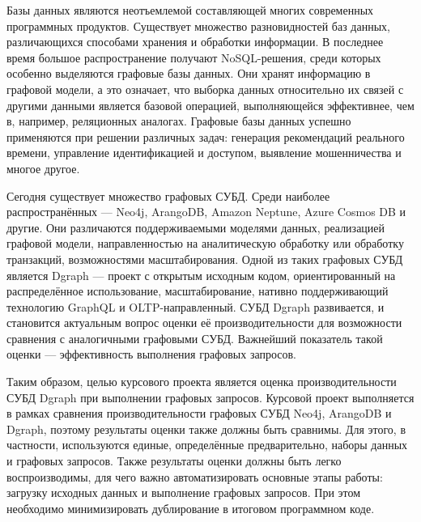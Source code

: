 
Базы данных являются неотъемлемой составляющей многих современных программных продуктов. Существует множество
разновидностей баз данных, различающихся способами хранения и обработки информации. В последнее время большое
распространение получают NoSQL-решения, среди которых особенно выделяются графовые базы данных. Они хранят информацию в
графовой модели, а это означает, что выборка данных относительно их связей с другими данными является базовой операцией,
выполняющейся эффективнее, чем в, например, реляционных аналогах. Графовые базы данных успешно применяются при решении
различных задач: генерация рекомендаций реального времени, управление идентификацией и доступом, выявление мошенничества
и многое другое.

Сегодня существует множество графовых СУБД. Среди наиболее распространённых --- Neo4j, ArangoDB, Amazon Neptune, Azure
Cosmos DB и другие. Они различаются поддерживаемыми моделями данных, реализацией графовой модели, направленностью на
аналитическую обработку или обработку транзакций, возможностями масштабирования. Одной из таких графовых СУБД является
Dgraph --- проект с открытым исходным кодом, ориентированный на распределённое использование, масштабирование, нативно
поддерживающий технологию GraphQL и OLTP-направленный. СУБД Dgraph развивается, и становится актуальным вопрос оценки
её производительности для возможности сравнения с аналогичными графовыми СУБД. Важнейший показатель такой оценки ---
эффективность выполнения графовых запросов.

Таким образом, целью курсового проекта является оценка производительности СУБД Dgraph при выполнении графовых запросов.
Курсовой проект выполняется в рамках сравнения производительности графовых СУБД Neo4j, ArangoDB и Dgraph, поэтому
результаты оценки также должны быть сравнимы. Для этого, в частности, используются единые, определённые предварительно,
наборы данных и графовых запросов. Также результаты оценки должны быть легко воспроизводимы, для чего важно
автоматизировать основные этапы работы: загрузку исходных данных и выполнение графовых запросов. При этом необходимо
минимизировать дублирование в итоговом программном коде.
